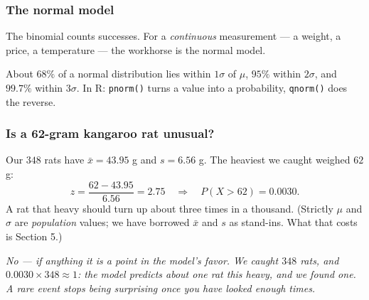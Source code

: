 \documentclass[slidestop,compress,mathserif]{beamer}
\newcommand{\soln}[1]{\textit{#1}}
\begin{document}
\begin{frame}
\frametitle{The normal model}

The binomial counts successes. For a \emph{continuous} measurement --- a weight, a price, a temperature --- the workhorse is the normal model.

\vspace{0.2em}

\vspace{0.2em}
{\small About $68\%$ of a normal distribution lies within $1\sigma$ of $\mu$, $95\%$ within $2\sigma$, and $99.7\%$ within $3\sigma$. In R: \texttt{pnorm()} turns a value into a probability, \texttt{qnorm()} does the reverse.}

\end{frame}

\begin{frame}
\frametitle{Is a 62-gram kangaroo rat unusual?}

Our $348$ rats have $\bar{x} = 43.95$ g and $s = 6.56$ g. The heaviest we caught weighed $62$ g:
\[
z = \frac{62 - 43.95}{6.56} = 2.75
\quad\Longrightarrow\quad
P(X > 62) = 0.0030 .
\]
\vspace{-0.4em}
{\small A rat that heavy should turn up about three times in a thousand. (Strictly $\mu$ and $\sigma$ are \emph{population} values; we have borrowed $\bar{x}$ and $s$ as stand-ins. What that costs is Section 5.)}

\vspace{0.2em}

\pause
\vspace{-0.3em}
{\footnotesize
\soln{No --- if anything it is a point in the model's favor. We caught $348$ rats, and $0.0030 \times 348 \approx 1$: the model predicts about one rat this heavy, and we found one. A rare event stops being surprising once you have looked enough times.}}

\end{frame}

\end{document}
